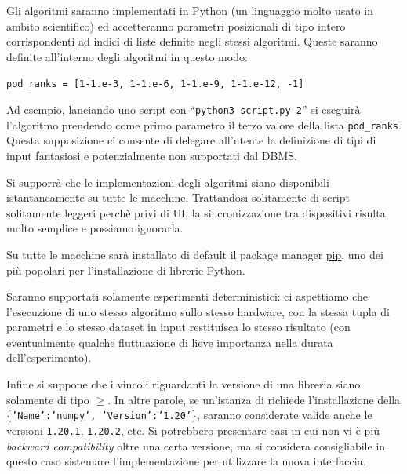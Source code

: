 \documentclass{article}
\begin{document}
Gli algoritmi saranno implementati in Python (un linguaggio molto usato in ambito scientifico) ed accetteranno parametri posizionali di tipo intero corrispondenti ad indici di liste definite negli stessi algoritmi. Queste saranno definite all'interno degli algoritmi in questo modo:

\verb|pod_ranks = [1-1.e-3, 1-1.e-6, 1-1.e-9, 1-1.e-12, -1]|

Ad esempio, lanciando uno script con ``\texttt{python3 script.py 2}'' si eseguirà l'algoritmo prendendo come primo parametro il terzo valore della lista \texttt{pod\_ranks}. Questa supposizione ci consente di delegare all'utente la definizione di tipi di input fantasiosi e potenzialmente non supportati dal DBMS.

Si supporrà che le implementazioni degli algoritmi siano disponibili istantaneamente su tutte le macchine. Trattandosi solitamente di script solitamente leggeri perchè privi di UI, la sincronizzazione tra dispositivi risulta molto semplice e possiamo ignorarla.

Su tutte le macchine sarà installato di default il package manager \href{https://pypi.org/project/pip/}{pip}, uno dei più popolari per l'installazione di librerie Python.

Saranno supportati solamente esperimenti deterministici: ci aspettiamo che l'esecuzione di uno stesso algoritmo sullo stesso hardware, con la stessa tupla di parametri e lo stesso dataset in input restituisca lo stesso risultato (con eventualmente qualche fluttuazione di lieve importanza nella durata dell'esperimento).

Infine si suppone che i vincoli riguardanti la versione di una libreria siano solamente di tipo $\geq$. In altre parole, se un'istanza di  richiede l'installazione della  \{\texttt{'Name':'numpy', 'Version':'1.20'}\}, saranno considerate valide anche le versioni \texttt{1.20.1}, \texttt{1.20.2}, etc. Si potrebbero presentare casi in cui non vi è più \emph{backward compatibility} oltre una certa versione, ma si considera consigliabile in questo caso sistemare l'implementazione per utilizzare la nuova interfaccia.
\end{document}
